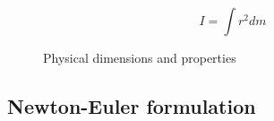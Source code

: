 \begin{equation}\label{inertiacalc}
I = \int r^{2}dm
\end{equation}

\begin{figure}[h!]    
    \centering           
    \def\svgwidth{.9\columnwidth}
    
    \caption{Physical dimensions and properties}
    \label{physical}
    \vspace{-1cm}
\end{figure}

%
%
%
%
%
%
%
%



\subsection{Newton-Euler formulation}

